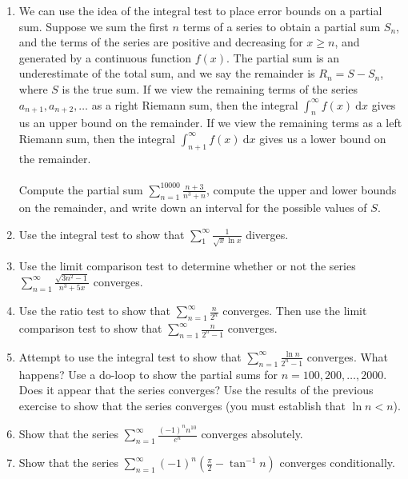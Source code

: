 \documentclass[10.5pt,twoside]{report}
\theoremstyle{definition}
\begin{document}
\begin{enumerate}
\item  We can use the idea of the integral test to place error bounds on a partial sum.  Suppose we sum the first $n$ terms of a series to obtain a partial sum $S_n$, and the terms of the series are positive and decreasing for $x \geq n$, and generated by a continuous function $f(x)$.  The partial sum is an underestimate of the total sum, and we say the remainder is $R_n=S-S_n$, where $S$ is the true sum.  If we view the remaining terms of the series $a_{n+1},a_{n+2},\dots$ as a right Riemann sum, then the integral $\displaystyle \int_n^{\infty} f(x)\ \mathrm{d}x$ gives us an upper bound on the remainder.  If we view the remaining terms as a left Riemann sum, then the integral $\displaystyle \int_{n+1}^{\infty} f(x)\ \mathrm{d}x$ gives us a lower bound on the remainder.\\
${}$\\
Compute the partial sum $\sum_{n=1}^{10000} \frac {n+3}{n^3+n}$, compute the upper and lower bounds on the remainder, and write down an interval for the possible values of $S$.  

\item Use the integral test to show that $ \sum_{1}^{\infty} \frac{1}{\sqrt{x} \ln{x}}$ diverges.

 

\item Use the limit comparison test to determine whether or not the series $\sum_{n=1}^{\infty} \frac{\sqrt{3n^2-1}}{n^3+5x}$ converges.  

\item Use the ratio test to show that $\sum_{n=1}^{\infty} \frac{n}{2^n}$ converges.  Then use the limit comparison test to show that $\sum_{n=1}^{\infty} \frac{n}{2^n-1}$ converges.

\item Attempt to use the integral test to show that $\sum_{n=1}^{\infty} \frac{\ln{n}}{2^n-1}$ converges.  What happens?  Use a do-loop to show the partial sums for $n=100,200,\dots ,2000$.  Does it appear that the series converges?  Use the results of the previous exercise to show that the series converges (you must establish that $\ln{n}<n$).

\item Show that the series $\sum_{n=1}^{\infty} \frac{(-1)^n n^{10}}{e^n}$ converges absolutely.

\item Show that the series $\sum_{n=1}^{\infty} (-1)^n \left( \frac {\pi}{2}-\tan^{-1}{n}\right)$ converges conditionally.  



\end{enumerate}
\end{document}
